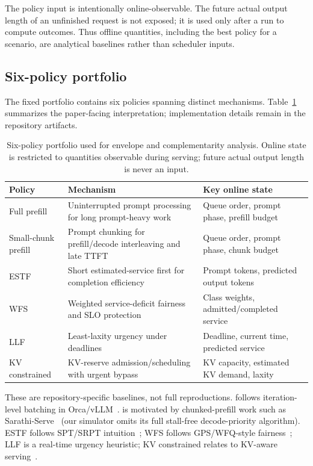 \documentclass[runningheads]{llncs}
\begin{document}
The policy input is intentionally online-observable. The future actual output
length of an unfinished request is not exposed; it is used only after a run to
compute outcomes. Thus offline \vbs{} quantities, including the best policy for
a scenario, are analytical baselines rather than scheduler inputs.

\subsection{Six-policy portfolio}

The fixed portfolio contains six policies spanning distinct mechanisms.
Table~\ref{tab:policy-matrix} summarizes the paper-facing interpretation;
implementation details remain in the repository artifacts.

\begin{table}
\centering
\scriptsize
\caption{Six-policy portfolio used for envelope and complementarity analysis.
Online state is restricted to quantities observable during serving; future
actual output length is never an input.}
\label{tab:policy-matrix}
\setlength{\tabcolsep}{4pt}
\renewcommand{\arraystretch}{0.9}
\begin{tabular}{@{}p{}p{}p{}@{}}
\toprule
Policy & Mechanism & Key online state \\
\midrule
Full prefill & Uninterrupted prompt processing for long prompt-heavy work & Queue order, prompt phase, prefill budget \\
Small-chunk prefill & Prompt chunking for prefill/decode interleaving and late TTFT & Queue order, prompt phase, chunk budget \\
ESTF & Short estimated-service first for completion efficiency & Prompt tokens, predicted output tokens \\
WFS & Weighted service-deficit fairness and SLO protection & Class weights, admitted/completed service \\
LLF & Least-laxity urgency under deadlines & Deadline, current time, predicted service \\
KV constrained & KV-reserve admission/scheduling with urgent bypass & KV capacity, estimated KV demand, laxity \\
\bottomrule
\end{tabular}
\renewcommand{\arraystretch}{1}
\end{table}

These are repository-specific baselines, not full reproductions.
 follows iteration-level batching in Orca/vLLM~\cite{orca2022,vllm2023}.
 is motivated by
chunked-prefill work such as Sarathi-Serve~\cite{sarathi2024} (our simulator
omits its full stall-free decode-priority algorithm). ESTF follows SPT/SRPT
intuition~\cite{schrage1968queuejumping}; WFS follows GPS/WFQ-style
fairness~\cite{parekh1993gps,demers1989fairqueueing,vtc2024}; LLF is a
real-time urgency heuristic; KV constrained relates to KV-aware
serving~\cite{vllm2023,kvscheduling2025}.
\end{document}

